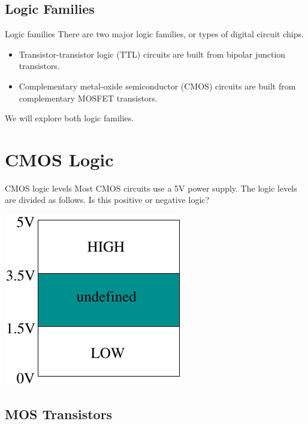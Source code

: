 \subsection{Logic Families}

\begin{frame}{Logic families}
  There are two major logic families, or types of digital circuit chips.
  \begin{itemize}
    \item Transistor-transistor logic (TTL) circuits are built from bipolar junction transistors.
    \item Complementary metal-oxide semiconductor (CMOS) circuits are built from complementary MOSFET transistors.
  \end{itemize}
  We will explore both logic families.
\end{frame}

\section{CMOS Logic}

\begin{frame}{CMOS logic levels}
  Most CMOS circuits use a 5V power supply.  The logic levels are divided as follows.  Is this positive or negative logic?
  \begin{center}
    \includegraphics{CMOSLogicLevels}
  \end{center}
\end{frame}

\subsection{MOS Transistors}

